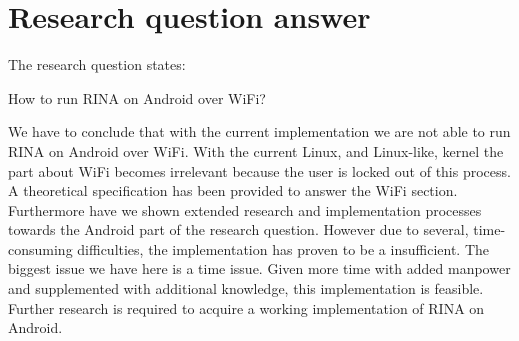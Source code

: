 \section{Research question answer}


The research question states: \\
\begin{highlight}How to run RINA on Android over WiFi?\end{highlight}

\npar

We have to conclude that with the current implementation we are not able to run RINA on Android over WiFi. With the current Linux, and Linux-like, kernel the part about WiFi becomes irrelevant because the user is locked out of this process. A theoretical specification has been provided to answer the WiFi section. Furthermore have we shown extended research and implementation processes towards the Android part of the research question. However due to several, time-consuming difficulties, the implementation has proven to be a insufficient. The biggest issue we have here is a time issue. Given more time with added manpower and supplemented with additional knowledge, this implementation is feasible. Further research is required to acquire a working implementation of RINA on Android. 

